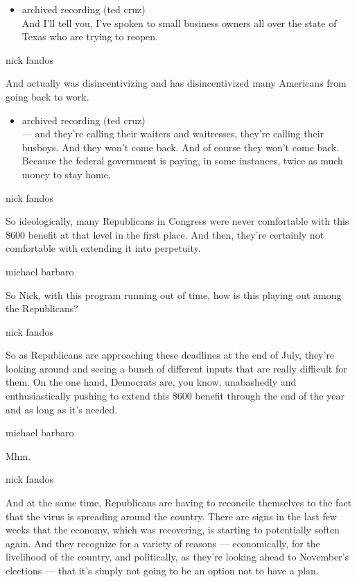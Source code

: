 \begin{itemize}
\tightlist
\item
  archived recording (ted cruz)\\
  And I'll tell you, I've spoken to small business owners all over the
  state of Texas who are trying to reopen.
\end{itemize}

nick fandos

And actually was disincentivizing and has disincentivized many Americans
from going back to work.

\begin{itemize}
\tightlist
\item
  archived recording (ted cruz)\\
  --- and they're calling their waiters and waitresses, they're calling
  their busboys. And they won't come back. And of course they won't come
  back. Because the federal government is paying, in some instances,
  twice as much money to stay home.
\end{itemize}

nick fandos

So ideologically, many Republicans in Congress were never comfortable
with this \$600 benefit at that level in the first place. And then,
they're certainly not comfortable with extending it into perpetuity.

michael barbaro

So Nick, with this program running out of time, how is this playing out
among the Republicans?

nick fandos

So as Republicans are approaching these deadlines at the end of July,
they're looking around and seeing a bunch of different inputs that are
really difficult for them. On the one hand, Democrats are, you know,
unabashedly and enthusiastically pushing to extend this \$600 benefit
through the end of the year and as long as it's needed.

michael barbaro

Mhm.

nick fandos

And at the same time, Republicans are having to reconcile themselves to
the fact that the virus is spreading around the country. There are signs
in the last few weeks that the economy, which was recovering, is
starting to potentially soften again. And they recognize for a variety
of reasons --- economically, for the livelihood of the country, and
politically, as they're looking ahead to November's elections --- that
it's simply not going to be an option not to have a plan.


